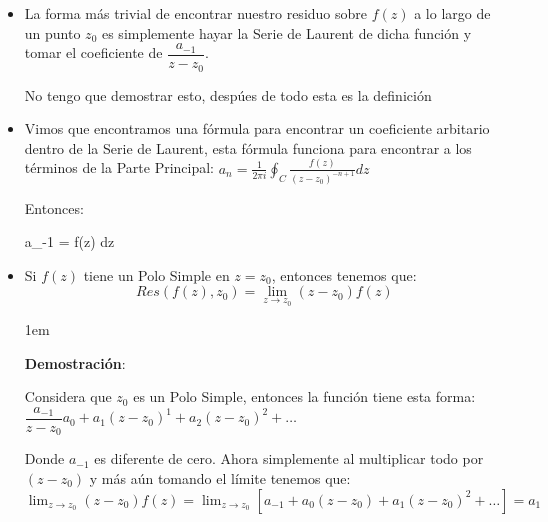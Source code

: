 \documentclass[12pt, fleqn]{report}                             %
\newenvironment{SmallIndentation}[1][0.75em]                    %
        {\begin{adjustwidth}{#1}{}\begin{footnotesize}}             %
        {\end{footnotesize}\end{adjustwidth}}                       %
\def \Eq {equation}                                             %
\newenvironment{MultiLineEquation*}[1]                          %
        {\begin{\Eq*}\begin{alignedat}{#1}}                         %
        {\end{alignedat}\end{\Eq*}}                                 %
\theoremstyle{break}                                            %
\begin{document}
                \begin{itemize}

                    \item
                        La forma más trivial de encontrar nuestro residuo sobre $f(z)$
                        a lo largo de un punto $z_0$ es simplemente hayar la Serie de Laurent
                        de dicha función y tomar el coeficiente de $\dfrac{a_{-1}}{z-z_0}$.

                        No tengo que demostrar esto, despúes de todo esta es la definición


                    \item
                        Vimos que encontramos una fórmula para encontrar un coeficiente arbitario
                        dentro de la Serie de Laurent, esta fórmula funciona para encontrar a
                        los términos de la Parte Principal:
                        $a_n = \frac{1}{2 \pi i} \oint_C \frac{f(z)}{(z - z_0)^{-n+1}} dz$

                        Entonces:
                        \begin{MultiLineEquation*}{3}
                            a_{-1} =  \oint f(z) dz
                        \end{MultiLineEquation*}
                            
                    
                    \item 
                        Si $f(z)$ tiene un Polo Simple en $z = z_0$, entonces
                        tenemos que:
                        \begin{equation*}
                            Res(f(z), z_0) = \lim_{z \to z_0} (z - z_0) f(z)
                        \end{equation*} 

                        \begin{SmallIndentation}[1em]
                            \textbf{Demostración}:
                            
                            Considera que $z_0$ es un Polo Simple, entonces la función
                            tiene esta forma:
                            $\dfrac{a_{-1}}{z-z_0} a_0 + a_1(z - z_0)^1 
                                        + a_2(z - z_0)^2 + \dots$

                            Donde $a_{-1}$ es diferente de cero. Ahora simplemente al
                            multiplicar todo por $(z-z_0)$ y más aún tomando el
                            límite tenemos que:
                            $\lim_{z \to z_0} (z - z_0) f(z)
                                    = \lim_{z \to z_0} [a_{-1} + a_0(z - z_0) 
                                        + a_1(z - z_0)^2 + \dots]           
                                    = a_1$
                                

\end{SmallIndentation}
\end{itemize}
\end{document}

